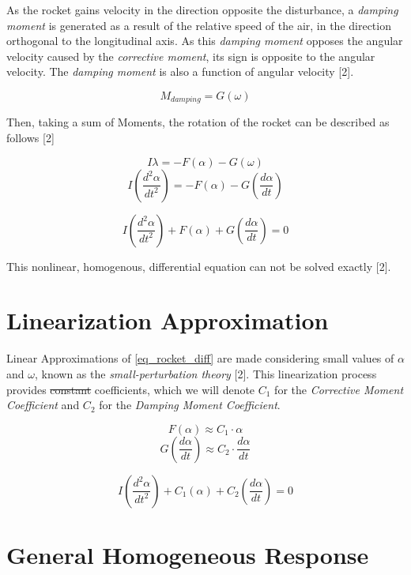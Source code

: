 \documentclass[]{book}
\begin{document}
As the rocket gains velocity in the direction opposite the disturbance,
a \emph{damping moment} is generated as a result of the relative speed
of the air, in the direction orthogonal to the longitudinal axis. As
this \emph{damping moment} opposes the angular velocity caused by the
\emph{corrective moment}, its sign is opposite to the angular velocity.
The \emph{damping moment} is also a function of angular velocity
{[}2{]}.

\begin{equation}
M_{damping} = G (\omega)
\end{equation}

Then, taking a sum of Moments, the rotation of the rocket can be
described as follows {[}2{]}

\[
I \lambda = -F(\alpha) - G(\omega) 
\] \[
I \left( \dfrac{d^2\alpha}{dt^2} \right) = -F(\alpha) - G \left(\dfrac{d\alpha}{dt} \right) 
\]

\begin{equation}
\label{eq_rocket_diff}
I \left( \dfrac{d^2\alpha}{dt^2} \right) + F(\alpha) + G \left(\dfrac{d\alpha}{dt} \right) = 0
\end{equation}

This nonlinear, homogenous, differential equation can not be solved
exactly {[}2{]}.

\section{Linearization Approximation}\label{linearization-approximation}

Linear Approximations of \ref{eq_rocket_diff} are made considering small
values of \(\alpha\) and \(\omega\), known as the
\emph{small-perturbation theory} {[}2{]}. This linearization process
provides \sout{constant} coefficients, which we will denote \(C_1\) for
the \emph{Corrective Moment Coefficient} and \(C_2\) for the
\emph{Damping Moment Coefficient}.

\[
F(\alpha) \approx C_1 \cdot \alpha 
\] \[
G \left(\dfrac{d\alpha}{dt} \right) \approx C_2 \cdot \dfrac{d\alpha}{dt} 
\]

\begin{equation}
\label{eq_rocket_diff_linearized}
I \left( \dfrac{d^2\alpha}{dt^2} \right) + C_1 (\alpha) + C_2 \left(\dfrac{d\alpha}{dt} \right) = 0
\end{equation}

\section{General Homogeneous
Response}\label{general-homogeneous-response}
\end{document}
